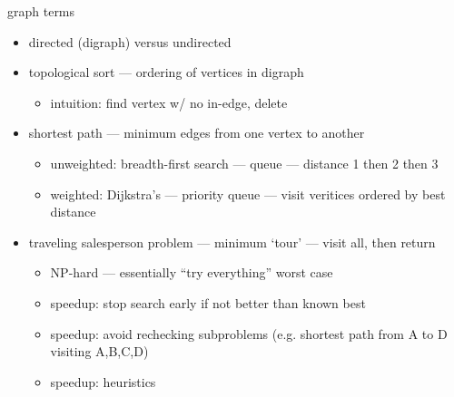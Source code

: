 \begin{frame}{graph terms}
\begin{itemize}
\item directed (digraph) versus undirected
\item topological sort --- ordering of vertices in digraph
    \begin{itemize}
    \item intuition: find vertex w/ no in-edge, delete
    \end{itemize}
\item shortest path --- minimum edges from one vertex to another
    \begin{itemize}
    \item unweighted: breadth-first search --- queue --- distance 1 then 2 then 3
    \item weighted: Dijkstra's --- priority queue --- visit veritices ordered by best distance
    \end{itemize}
\item traveling salesperson problem --- minimum `tour' --- visit all, then return
    \begin{itemize}
    \item NP-hard --- essentially ``try everything'' worst case
    \item speedup: stop search early if not better than known best
    \item speedup: avoid rechecking subproblems (e.g. shortest path from A to D visiting A,B,C,D)
    \item speedup: heuristics
    \end{itemize}
\end{itemize}
\end{frame}
